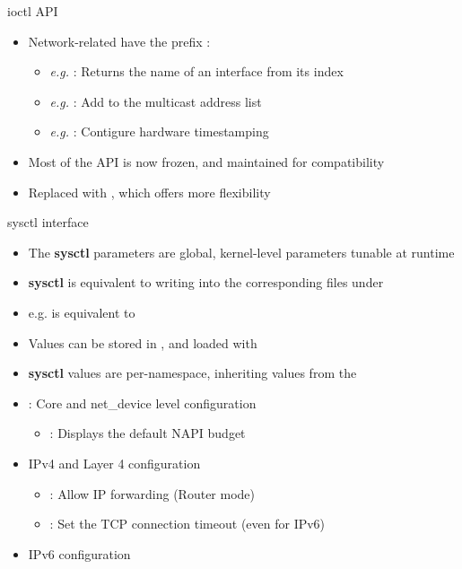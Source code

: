 \begin{frame}{ioctl API}
	\begin{itemize}
		\item Network-related  have the  prefix :
			\begin{itemize}
				\item \textit{e.g.}  : Returns the name of an interface from its index
				\item \textit{e.g.}  : Add to the multicast address list
				\item \textit{e.g.}  : Contigure hardware timestamping
			\end{itemize}
		\item Most of the  API is now frozen, and maintained for compatibility
		\item Replaced with , which offers more flexibility
	\end{itemize}
\end{frame}

\begin{frame}{sysctl interface}
	\begin{itemize}
		\item The \textbf{sysctl} parameters are global, kernel-level parameters tunable at runtime
		\item \textbf{sysctl} is equivalent to writing into the corresponding files under 
		\item e.g.  is equivalent to 
		\item Values can be stored in , and loaded with 
		\item \textbf{sysctl} values are per-namespace, inheriting values from the 
		\item {} : Core and net\_device level configuration
			\begin{itemize}
				\item {} : Displays the default NAPI budget
			\end{itemize}
		\item {} IPv4 and Layer 4 configuration
			\begin{itemize}
				\item {} : Allow IP forwarding (Router mode)
				\item {} : Set the TCP connection timeout (even for IPv6)
			\end{itemize}

		\item {} IPv6 configuration

	\end{itemize}
\end{frame}

